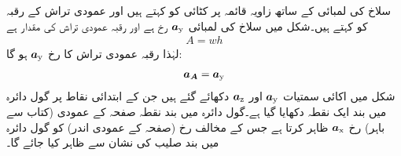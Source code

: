 سلاخ  کی لمبائی کے ساتھ زاویہ قائمہ  پر  کٹائی کو  کہتے ہیں اور عمودی تراش کے رقبہ کو  کہتے ہیں۔شکل   میں  سلاخ کی لمبائی   ${\boldsymbol{a}}_{\textup{y}}$  رخ  ہے اور  رقبہ عمودی تراش  کی مقدار  ہے
\begin{align}
A=wh
\end{align}
لہٰذا رقبہ عمودی تراش کا رخ  ${\boldsymbol{a}}_{\textup{y}}$  ہو گا:
\begin{align}
{\ensuremath{{\boldsymbol{a_A}}}}={\boldsymbol{a}}_{\textup{y}}
\end{align}
شکل   میں  اکائی سمتیات  ${\boldsymbol{a}}_{\textup{y}}$  اور  ${\boldsymbol{a}}_{\textup{z}}$ دکھائے گئے ہیں جن کے ابتدائی نقاط پر گول دائرہ میں بند ایک نقطہ دکھایا گیا ہے۔گول دائرہ میں بند نقطہ صفحہ کے عمودی (کتاب سے باہر)  رخ  ${\boldsymbol{a}}_{\textup{x}}$ ظاہر کرتا ہے جس کے مخالف رخ  (صفحہ کے عمودی اندر)  کو گول دائرہ میں بند صلیب کی نشان سے ظاہر کیا جائے گا۔
%
